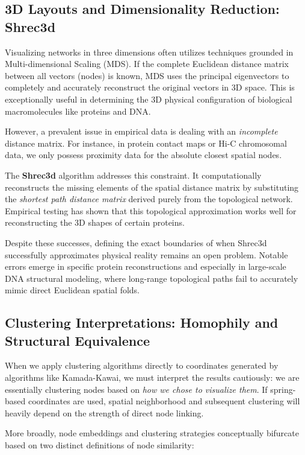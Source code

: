 \subsection{3D Layouts and Dimensionality Reduction: Shrec3d}
\label{subsec:3d_layouts_shrec3d}

Visualizing networks in three dimensions often utilizes techniques grounded in Multi-dimensional Scaling (MDS). If the complete Euclidean distance matrix between all vectors (nodes) is known, MDS uses the principal eigenvectors to completely and accurately reconstruct the original vectors in 3D space. This is exceptionally useful in determining the 3D physical configuration of biological macromolecules like proteins and DNA.

However, a prevalent issue in empirical data is dealing with an \textit{incomplete} distance matrix. For instance, in protein contact maps or Hi-C chromosomal data, we only possess proximity data for the absolute closest spatial nodes.

The \textbf{Shrec3d} algorithm addresses this constraint. It computationally reconstructs the missing elements of the spatial distance matrix by substituting the \textit{shortest path distance matrix} derived purely from the topological network. Empirical testing has shown that this topological approximation works well for reconstructing the 3D shapes of certain proteins.

Despite these successes, defining the exact boundaries of when Shrec3d successfully approximates physical reality remains an open problem. Notable errors emerge in specific protein reconstructions and especially in large-scale DNA structural modeling, where long-range topological paths fail to accurately mimic direct Euclidean spatial folds.

\subsection{Clustering Interpretations: Homophily and Structural Equivalence}
\label{subsec:homophily_structural_equivalence}

When we apply clustering algorithms directly to coordinates generated by algorithms like Kamada-Kawai, we must interpret the results cautiously: we are essentially clustering nodes based on \textit{how we chose to visualize them}. If spring-based coordinates are used, spatial neighborhood and subsequent clustering will heavily depend on the strength of direct node linking.

More broadly, node embeddings and clustering strategies conceptually bifurcate based on two distinct definitions of node similarity:

